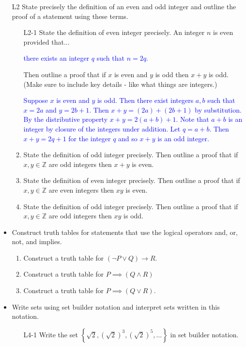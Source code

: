 \documentclass[11pt]{article}
\newcommand{\Z}{\mathbb{Z}}
\newcommand{\bs}{\begin{solution}}
\begin{document}
\begin{itemize}
\item[L2] State precisely the definition of an even and odd integer and outline the proof of a statement using these terms.
	\begin{enumerate}
	\item[L2-1] State the definition of even integer precisely. 
		An integer $n$ is even provided that...
	
	\bs\textcolor{blue}{ there exists an integer $q$ such that $n=2q$.}\end{solution}
	
	Then outline a proof that if $x$ is even and $y$ is odd then $x+y$ is odd. (Make sure to include key details - like what things are integers.)
	
	\bs\textcolor{blue}{Suppose $x$ is even and $y$ is odd. Then there exist integers $a,b$ such that $x=2a$ and $y=2b+1$. Then $x+y=(2a)+(2b+1)$ by substitution. By the distributive property $x+y=2(a+b)+1$. Note that $a+b$ is an integer by closure of the integers under addition. Let $q=a+b$. Then $x+y=2q+1$ for the integer $q$ and so $x+y$ is an odd integer.}\end{solution}
	
	\item[L2-2] State the definition of odd integer precisely. Then outline a proof that if $x,y\in \Z$ are odd integers then $x+y$ is even.
	\item[L2-3] State the definition of even integer precisely. Then outline a proof that if $x,y\in \Z$ are even integers then $xy$ is even.
	\item[L2-token] State the definition of odd integer precisely. Then outline a proof that if $x,y\in \Z$ are odd integers then $xy$ is odd.
	\end{enumerate}
	
\newpage

\item[L3] Construct truth tables for statements that use the logical operators and, or, not, and implies.
	\begin{enumerate}
	\item  Construct a truth table for $(\neg P\vee Q) \rightarrow R$.
	\item Construct a truth table for $P \implies (Q\wedge R)$
	\item Construct a truth table for $P \implies (Q\vee R)$.
	\end{enumerate}

\newpage

\item[L4] Write sets using set builder notation and interpret sets written in this notation.
	\begin{enumerate}
		\item[L4-1] Write the set $\left\{ \sqrt{2}, \left(\sqrt{2}\right)^3, \left(\sqrt{2}\right)^5,\dots\right\}$ in set builder notation.


\end{enumerate}
\end{itemize}
\end{document}
